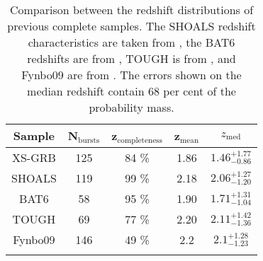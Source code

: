 \begin{table}[H]
	\centering
	\begin{tabular}{ccccc}
		\hline
		\hline\noalign{\smallskip}
		{Sample} & {N$_{\mathrm{bursts}}$} & {z$_{\mathrm{completeness}}$} &  {z$_{\mathrm{mean}}$} &  {$z_{\mathrm{med}}$} \\
		\hline\noalign{\smallskip}
		{\smallskip}
		XS-GRB & 125 & 84 \% & 1.86 & $1.46_{-0.86}^{+1.77}$ \\
		{\smallskip}
		SHOALS  & 119 &  99 \% &  2.18  & $2.06_{-1.20}^{+1.27}$ \\
		{\smallskip}
		BAT6 & 58 & 95 \% &  1.90 &  $1.71_{-1.04}^{+1.31}$ \\
		{\smallskip}
		TOUGH & 69 &  77 \% & 2.20 & $2.11_{-1.36}^{+1.42}$ \\
		{\smallskip}
		Fynbo09 & 146 &  49 \% &  2.2 & $2.1_{-1.23}^{+1.28}$ \\
		\hline\noalign{\smallskip}

\end{tabular} 

\caption{Comparison between the redshift distributions of previous complete
	samples. The SHOALS redshift characteristics are taken from \citet{Perley2016a},
	the BAT6 redshifts are from \citet{Salvaterra2012}, TOUGH is from
	\cite{Hjorth2012}, and Fynbo09 are from \citet{Fynbo2009}. The errors shown on
	the median redshift contain 68 per cent of the probability mass.
	\label{tab:redshift_comparison}}



\end{table}